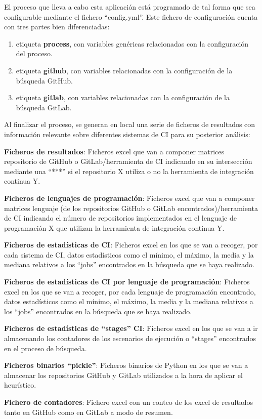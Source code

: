 El proceso que lleva a cabo esta aplicación está programado de tal forma que sea configurable mediante el fichero ``config.yml''. Este fichero de configuración cuenta con tres partes bien diferenciadas:

\begin{enumerate}
    \item etiqueta \textbf{process}, con variables genéricas relacionadas con la configuración del proceso.
    \item etiqueta \textbf{github}, con variables relacionadas con la configuración de la búsqueda GitHub.
    \item etiqueta \textbf{gitlab}, con variables relacionadas con la configuración de la búsqueda GitLab.
\end{enumerate}

Al finalizar el proceso, se generan en local una serie de ficheros de resultados con información relevante sobre diferentes sistemas de CI para su posterior análisis:

\begin{compactitem}
    \item \textbf{Ficheros de resultados}: Ficheros excel que van a componer matrices repositorio de GitHub o GitLab/herramienta de CI indicando en su intersección mediante una ``***'' si el repositorio X utiliza o no la herramienta de integración continua Y.
    \item \textbf{Ficheros de lenguajes de programación}: Ficheros excel que van a componer matrices lenguaje (de los repositorios GitHub o GitLab encontrados)/herramienta de CI indicando el número de repositorios implementados en el lenguaje de programación X que utilizan la herramienta de integración continua Y.
    \item \textbf{Ficheros de estadísticas de CI}: Ficheros excel en los que se van a recoger, por cada sistema de CI, datos estadísticos como el mínimo, el máximo, la media y la mediana relativos a los ``jobs'' encontrados en la búsqueda que se haya realizado.
    \item \textbf{Ficheros de estadísticas de CI por lenguaje de programación}: Ficheros excel en los que se van a recoger, por cada lenguaje de programación encontrado, datos estadísticos como el mínimo, el máximo, la media y la mediana relativos a los ``jobs'' encontrados en la búsqueda que se haya realizado.
    \item \textbf{Ficheros de estadísticas de ``stages'' CI}: Ficheros excel en los que se van a ir almacenando los contadores de los escenarios de ejecución o ``stages'' encontrados en el proceso de búsqueda.
    \item \textbf{Ficheros binarios ``pickle''}: Ficheros binarios de Python en los que se van a almacenar los repositorios GitHub y GitLab utilizados a la hora de aplicar el heurístico.
    \item \textbf{Fichero de contadores}: Fichero excel con un conteo de los excel de resultados tanto en GitHub como en GitLab a modo de resumen.
\end{compactitem}

